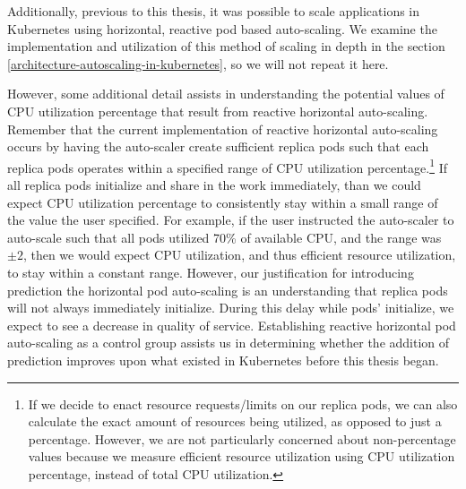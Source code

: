 Additionally, previous to this thesis, it was possible to scale applications in
Kubernetes using horizontal, reactive pod based auto-scaling. We examine the implementation
and utilization of this method of scaling in depth in the section
\ref{architecture-autoscaling-in-kubernetes}, so we will not repeat it here.

However, some additional detail assists in understanding the potential values of
CPU utilization percentage that result from reactive horizontal auto-scaling.
Remember that the current implementation of reactive horizontal auto-scaling
occurs by having the auto-scaler create sufficient replica pods such that each
replica pods operates within a specified range of CPU utilization percentage.\footnote{If
  we decide to enact resource requests/limits on our replica pods, we can also
calculate the exact amount of resources being utilized, as opposed to just a
percentage. However, we are not particularly concerned about non-percentage
values because we measure efficient resource utilization using CPU utilization
percentage, instead of total CPU utilization.} If all replica pods initialize
and share in the work immediately, than we could expect CPU utilization
percentage to consistently stay within a small range of the value the user
specified. For example, if the user instructed the auto-scaler to auto-scale
such that all pods utilized 70\% of available CPU, and the range was $\pm 2$,
then we would expect CPU utilization, and thus efficient resource utilization,
to stay within a constant range.
However, our justification for introducing prediction
the horizontal pod auto-scaling is an understanding that replica pods will not
always immediately initialize. During this delay while pods' initialize, we expect to see
a decrease in quality of service.
Establishing reactive horizontal pod auto-scaling as a control group
assists us in determining whether the addition of prediction improves upon what
existed in Kubernetes before this thesis began.

